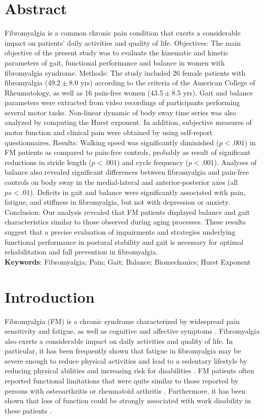 \documentclass[12pt]{article}
\begin{document}
\section*{Abstract}
Fibromyalgia is a common chronic pain condition that exerts a considerable impact on patients' daily activities and quality of life. Objectives: The main objective of the present study was to evaluate the kinematic and kinetic parameters of gait, functional performance and balance in women with fibromyalgia syndrome. Methods: The study included 26 female patients with fibromyalgia ($49.2 \pm 8.0$ yrs) according to the criteria of the American College of Rheumatology, as well as 16 pain-free women ($43.5 \pm 8.5$ yrs). Gait and balance parameters were extracted from video recordings of participants performing several motor tasks. Non-linear dynamic of body sway time series was also analyzed by computing the Hurst exponent. In addition, subjective measures of motor function and clinical pain were obtained by using self-report questionnaires. Results: Walking speed was significantly diminished ($p < .001$) in FM patients as compared to pain-free controls, probably as result of significant reductions in stride length ($p < .001$) and cycle frequency ($p < .001$). Analyses of balance also revealed significant differences between fibromyalgia and pain-free controls on body sway in the medial-lateral and anterior-posterior axes (all $ps < .01$). Deficits in gait and balance were significantly associated with pain, fatigue, and stiffness in fibromyalgia, but not with depression or anxiety. Conclusion: Our analysis revealed that FM patients displayed balance and gait characteristics similar to those observed during aging processes. These results suggest that a precise evaluation of impairments and strategies underlying functional performance in postural stability and gait is necessary for optimal rehabilitation and fall prevention in fibromyalgia.\\
\textbf{Keywords}: Fibromyalgia; Pain; Gait; Balance; Biomechanics; Hurst Exponent


\section*{Introduction}
Fibromyalgia (FM) is a chronic syndrome characterized by widespread pain sensitivity and fatigue, as well as cognitive and affective symptoms \cite{wolfe2010american}. Fibromyalgia also exerts a considerable impact on daily activities and quality of life. In particular, it has been frequently shown that fatigue in fibromyalgia may be severe enough to reduce physical activities and lead to a sedentary lifestyle by reducing physical abilities and increasing risk for disabilities \cite{jones2008self, bennett2007internet}. FM patients often reported functional limitations that were quite similar to those reported by persons with osteoarthritis or rheumatoid arthritis \cite{hawley1991pain, meireles2014prevalence}. Furthermore, it has been shown that loss of function could be strongly associated with work disability in these patients \cite{white1999comparing, wolfe2004severe}. 
\end{document}
